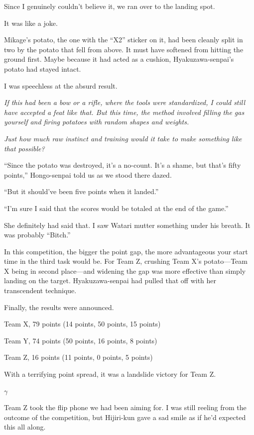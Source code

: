 \documentclass[
    a4paper,
    12pt,
    twoside,
    openany,
    UTF8,
    fontset=windows
]{ctexbook}
\begin{document}
Since I genuinely couldn't believe it, we ran over to the landing spot.

It was like a joke.

Mikage's potato, the one with the ``X2'' sticker on it, had been cleanly split in two by the potato that fell from above. It must have softened from hitting the ground first. Maybe because it had acted as a cushion, Hyakuzawa-senpai's potato had stayed intact.

I was speechless at the absurd result.

\textit{If this had been a bow or a rifle, where the tools were standardized, I could still have accepted a feat like that. But this time, the method involved filling the gas yourself and firing potatoes with random shapes and weights.}

\textit{Just how much raw instinct and training would it take to make something like that possible?}

``Since the potato was destroyed, it's a no-count. It's a shame, but that's fifty points,'' Hongo-senpai told us as we stood there dazed.

``But it should've been five points when it landed.''

``I'm sure I said that the scores would be totaled at the end of the game.''

She definitely had said that. I saw Watari mutter something under his breath. It was probably ``Bitch.''

In this competition, the bigger the point gap, the more advantageous your start time in the third task would be. For Team Z, crushing Team X's potato---Team X being in second place---and widening the gap was more effective than simply landing on the target. Hyakuzawa-senpai had pulled that off with her transcendent technique.

Finally, the results were announced.

\begin{center}
Team X, 79 points (14 points, 50 points, 15 points)

Team Y, 74 points (50 points, 16 points, 8 points)

Team Z, 16 points (11 points, 0 points, 5 points)
\end{center}

With a terrifying point spread, it was a landslide victory for Team Z.

$\gamma$

Team Z took the flip phone we had been aiming for. I was still reeling from the outcome of the competition, but Hijiri-kun gave a sad smile as if he'd expected this all along.
\end{document}

